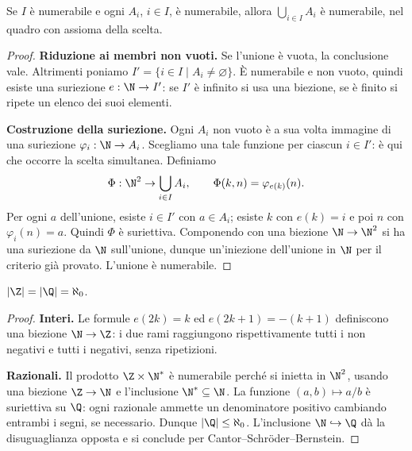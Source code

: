 \begin{teorema}\label{teo:unione-numerabile}
Se $I$ è numerabile e ogni $A_i$, $i\in I$, è numerabile, allora $\bigcup_{i\in I}A_i$ è numerabile, nel quadro con assioma della scelta.
\end{teorema}
\begin{proof}
\textbf{Riduzione ai membri non vuoti.} Se l'unione è vuota, la conclusione vale. Altrimenti poniamo $I'=\{i\in I\mid A_i\ne\varnothing\}$. È numerabile e non vuoto, quindi esiste una suriezione $e:\N\to I'$: se $I'$ è infinito si usa una biezione, se è finito si ripete un elenco dei suoi elementi.

\textbf{Costruzione della suriezione.} Ogni $A_i$ non vuoto è a sua volta immagine di una suriezione $\varphi_i:\N\to A_i$. Scegliamo una tale funzione per ciascun $i\in I'$: è qui che occorre la scelta simultanea. Definiamo
\[
\Phi:\N^2\to\bigcup_{i\in I}A_i,\qquad \Phi(k,n)=\varphi_{e(k)}(n).
\]
Per ogni $a$ dell'unione, esiste $i\in I'$ con $a\in A_i$; esiste $k$ con $e(k)=i$ e poi $n$ con $\varphi_i(n)=a$. Quindi $\Phi$ è suriettiva. Componendo con una biezione $\N\to\N^2$ si ha una suriezione da $\N$ sull'unione, dunque un'iniezione dell'unione in $\N$ per il criterio già provato. L'unione è numerabile.
\end{proof}

\begin{corollario}
$|\Z|=|\Q|=\aleph_0$.
\end{corollario}
\begin{proof}
\textbf{Interi.} Le formule $e(2k)=k$ ed $e(2k+1)=-(k+1)$ definiscono una biezione $\N\to\Z$: i due rami raggiungono rispettivamente tutti i non negativi e tutti i negativi, senza ripetizioni.

\textbf{Razionali.} Il prodotto $\Z\times\N^*$ è numerabile perché si inietta in $\N^2$, usando una biezione $\Z\to\N$ e l'inclusione $\N^*\subseteq\N$. La funzione $(a,b)\mapsto a/b$ è suriettiva su $\Q$: ogni razionale ammette un denominatore positivo cambiando entrambi i segni, se necessario. Dunque $|\Q|\le\aleph_0$. L'inclusione $\N\hookrightarrow\Q$ dà la disuguaglianza opposta e si conclude per Cantor--Schröder--Bernstein.
\end{proof}

